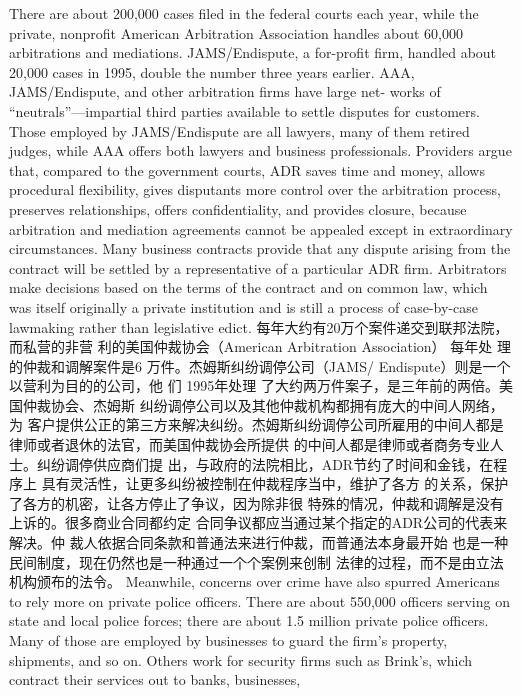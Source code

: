 \begin{paracol}{2}
\switchcolumn*
There are about 200,000 cases filed in the federal courts each
year, while the private, nonprofit American Arbitration Association handles about 60,000 arbitrations and mediations.
JAMS/Endispute, a for-profit firm, handled about 20,000 cases
in 1995, double the number three years earlier. AAA,
JAMS/Endispute, and other arbitration firms have large net-
works of ``neutrals''---impartial third parties available to settle
disputes for customers. Those employed by JAMS/Endispute
are all lawyers, many of them retired judges, while AAA offers
both lawyers and business professionals. Providers argue that,
compared to the government courts, ADR saves time and
money, allows procedural flexibility, gives disputants more control over the arbitration process, preserves relationships, offers
confidentiality, and provides closure, because arbitration and
mediation agreements cannot be appealed except in extraordinary circumstances. Many business contracts provide that any
dispute arising from the contract will be settled by a representative of a particular ADR firm. Arbitrators make decisions
based on the terms of the contract and on common law, which
was itself originally a private institution and is still a process of
case-by-case lawmaking rather than legislative edict.
\switchcolumn
每年大约有20万个案件递交到联邦法院，而私营的非营
利的美国仲裁协会（American Arbitration Association） 每年处
理的仲裁和调解案件是6 万件。杰姆斯纠纷调停公司（JAMS/
Endispute）则是一个以营利为目的的公司，他 们 1995年处理
了大约两万件案子，是三年前的两倍。美国仲裁协会、杰姆斯
纠纷调停公司以及其他仲裁机构都拥有庞大的中间人网络，为
客户提供公正的第三方来解决纠纷。杰姆斯纠纷调停公司所雇用的中间人都是律师或者退休的法官，而美国仲裁协会所提供
的中间人都是律师或者商务专业人士。纠纷调停供应商们提
出，与政府的法院相比，ADR节约了时间和金钱，在程序上
具有灵活性，让更多纠纷被控制在仲裁程序当中，维护了各方
的关系，保护了各方的机密，让各方停止了争议，因为除非很
特殊的情况，仲裁和调解是没有上诉的。很多商业合同都约定
合同争议都应当通过某个指定的ADR公司的代表来解决。仲
裁人依据合同条款和普通法来进行仲裁，而普通法本身最开始
也是一种民间制度，现在仍然也是一种通过一个个案例来创制
法律的过程，而不是由立法机构颁布的法令。
\switchcolumn*
Meanwhile, concerns over crime have also spurred Americans to rely more on private police officers. There are about
550,000 officers serving on state and local police forces; there
are about 1.5 million private police officers. Many of those are
employed by businesses to guard the firm's property, shipments, and so on. Others work for security firms such as
Brink's, which contract their services out to banks, businesses,

\end{paracol}
